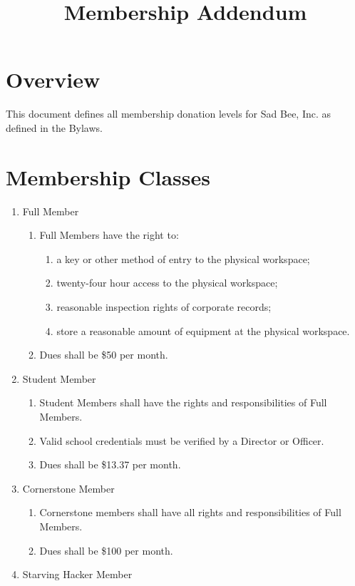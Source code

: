 \documentclass[11pt, oneside]{article}   	%
\title{Membership Addendum}
\begin{document}
\maketitle

\section{Overview}
This document defines all membership donation levels for Sad Bee, Inc. as defined in the Bylaws.

\section{Membership Classes}
\begin{enumerate}
  \item Full Member
  \begin{enumerate}
    \item Full Members have the right to:
    \begin{enumerate}
      \item a key or other method of entry to the physical workspace;
      \item twenty-four hour access to the physical workspace;
      \item reasonable inspection rights of corporate records;
      \item store a reasonable amount of equipment at the physical workspace.
    \end{enumerate}
    \item Dues shall be \$50 per month.
  \end{enumerate}
  \item Student Member
  \begin{enumerate}
    \item Student Members shall have the rights and responsibilities of Full Members.
    \item Valid school credentials must be verified by a Director or Officer.
    \item Dues shall be \$13.37 per month.
  \end{enumerate}
  \item Cornerstone Member
  \begin{enumerate}
    \item Cornerstone members shall have all rights and responsibilities of Full Members.
    \item Dues shall be \$100 per month.
  \end{enumerate}
	\item Starving Hacker Member

\end{enumerate}
\end{document}
